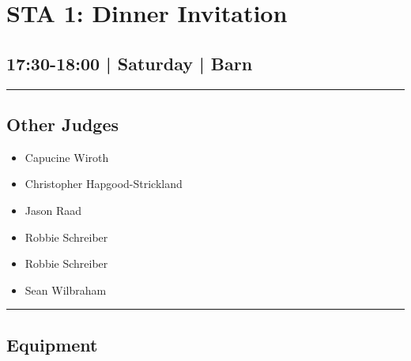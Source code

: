 \documentclass[10pt, A5]{article}
\begin{document}
        \begin{framed}
        \begin{minipage}{\textwidth}

        \setcounter{section}{35}
        \section{STA 1: Dinner Invitation}
        \subsection*{17:30-18:00 | Saturday | Barn}

        \vspace{0.25cm}
        \hrule
        \vspace{0.25cm}


        \subsection*{Other Judges}
                    

        	\begin{multicols}{2}

		\begin{itemize}
									\item Capucine Wiroth
									\item Christopher Hapgood-Strickland
									\item Jason Raad
									\item Robbie Schreiber
						\end{itemize}

		\vfill\null
		\columnbreak

		\begin{itemize}
									\item Robbie Schreiber
									\item Sean Wilbraham
						\end{itemize}

		\vfill\null

		\end{multicols}

    \vspace{0.25cm}
        \hrule
        \vspace{0.25cm}

        \begin{multicols}{2}

		\section*{\faWrench \: Equipment}


\end{multicols}
\end{minipage}
\end{framed}
\end{document}
